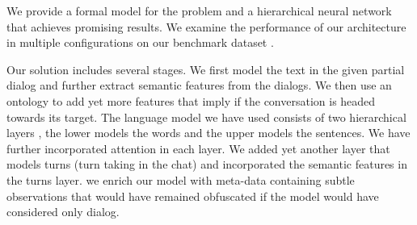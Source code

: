 We provide a formal model for the problem and a hierarchical neural network 
that achieves promising results. 
We examine the performance of our architecture 
in multiple configurations on our benchmark dataset \cite{frames}. 

Our solution includes several stages. 
We first model the text in the given partial dialog and further extract semantic features from the dialogs. 
We then use an ontology to add yet more features that imply if the conversation 
is headed towards its target. 
The language model we have used consists of two hierarchical layers \cite{attention}, the lower 
models the words and the upper models the sentences. We have further 
incorporated attention \cite{BahdanauCB14} in each layer. 
We added yet another layer that models turns (turn taking in the chat) and
incorporated the semantic features in the turns layer.
we enrich our model with meta-data containing subtle observations 
that would have remained obfuscated if the model would have considered only dialog. 



